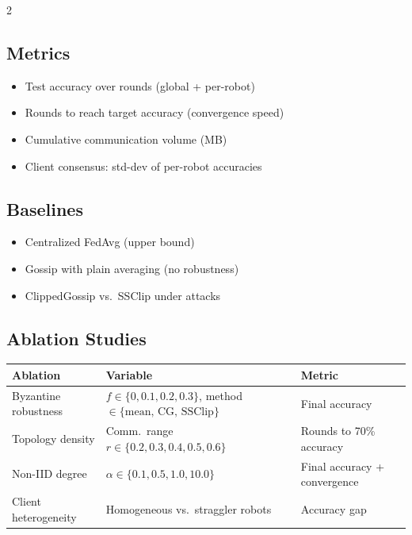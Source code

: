 \documentclass[10pt,letterpaper]{article}
\begin{document}
\begin{multicols}{2}
\subsection*{Metrics}
\begin{itemize}
  \item Test accuracy over rounds (global + per-robot)
  \item Rounds to reach target accuracy (convergence speed)
  \item Cumulative communication volume (MB)
  \item Client consensus: std-dev of per-robot accuracies
\end{itemize}

\columnbreak

\subsection*{Baselines}
\begin{itemize}
  \item Centralized FedAvg (upper bound)
  \item Gossip with plain averaging (no robustness)
  \item ClippedGossip vs.\ SSClip under attacks
\end{itemize}
\end{multicols}

\vspace{-4pt}

\subsection*{Ablation Studies}

\begin{center}
\small
\begin{tabular}{lll}
\toprule
\textbf{Ablation} & \textbf{Variable} & \textbf{Metric} \\
\midrule
Byzantine robustness & $f \in \{0, 0.1, 0.2, 0.3\}$, method $\in \{\text{mean, CG, SSClip}\}$ & Final accuracy \\
Topology density & Comm.\ range $r \in \{0.2, 0.3, 0.4, 0.5, 0.6\}$ & Rounds to 70\% accuracy \\
Non-IID degree & $\alpha \in \{0.1, 0.5, 1.0, 10.0\}$ & Final accuracy + convergence \\
Client heterogeneity & Homogeneous vs.\ straggler robots & Accuracy gap \\
\bottomrule
\end{tabular}
\end{center}
\end{document}
